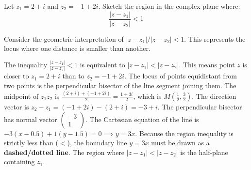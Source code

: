 
\begin{problem}
Let $z_1 = 2 + i$ and $z_2 = -1 + 2i$. Sketch the region in the complex plane where:
\[ \frac{|z - z_1|}{|z - z_2|} < 1 \]
\end{problem}

\begin{hint}
Consider the geometric interpretation of $|z - z_1|/|z - z_2| < 1$. This represents the locus where one distance is smaller than another.
\end{hint}

\begin{solution}
The inequality $\frac{|z - z_1|}{|z - z_2|} < 1$ is equivalent to $|z - z_1| < |z - z_2|$.
This means point $z$ is closer to $z_1 = 2 + i$ than to $z_2 = -1 + 2i$.
The locus of points equidistant from two points is the perpendicular bisector of the line segment joining them.
The midpoint of $z_1z_2$ is $\frac{(2+i) + (-1+2i)}{2} = \frac{1 + 3i}{2}$, which is $M\left(\frac{1}{2}, \frac{3}{2}\right)$.
The direction vector is $z_2 - z_1 = (-1+2i) - (2+i) = -3 + i$.
The perpendicular bisector has normal vector $\begin{pmatrix} -3 \\ 1 \end{pmatrix}$.
The Cartesian equation of the line is $-3(x - 0.5) + 1(y - 1.5) = 0 \implies y = 3x$.
Because the region inequality is strictly less than ($<$), the boundary line $y=3x$ must be drawn as a \textbf{dashed/dotted line}.
The region where $|z - z_1| < |z - z_2|$ is the half-plane containing $z_1$.
\begin{center}
\end{center}
\end{solution}

